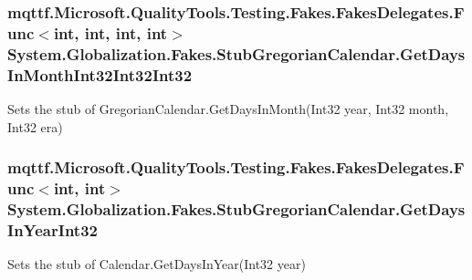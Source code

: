 \hypertarget{class_system_1_1_globalization_1_1_fakes_1_1_stub_gregorian_calendar_a970efcc1ed7aea103c4cc8fd1636b0a9}{
\subsubsection[{Get\-Days\-In\-Month\-Int32\-Int32\-Int32}]{\setlength{\rightskip}{0pt plus 5cm}mqttf.\-Microsoft.\-Quality\-Tools.\-Testing.\-Fakes.\-Fakes\-Delegates.\-Func$<$int, int, int, int$>$ System.\-Globalization.\-Fakes.\-Stub\-Gregorian\-Calendar.\-Get\-Days\-In\-Month\-Int32\-Int32\-Int32}}\label{class_system_1_1_globalization_1_1_fakes_1_1_stub_gregorian_calendar_a970efcc1ed7aea103c4cc8fd1636b0a9}


Sets the stub of Gregorian\-Calendar.\-Get\-Days\-In\-Month(\-Int32 year, Int32 month, Int32 era)

\hypertarget{class_system_1_1_globalization_1_1_fakes_1_1_stub_gregorian_calendar_a13e0a6c756144daecad794eef48fa86d}{
\subsubsection[{Get\-Days\-In\-Year\-Int32}]{\setlength{\rightskip}{0pt plus 5cm}mqttf.\-Microsoft.\-Quality\-Tools.\-Testing.\-Fakes.\-Fakes\-Delegates.\-Func$<$int, int$>$ System.\-Globalization.\-Fakes.\-Stub\-Gregorian\-Calendar.\-Get\-Days\-In\-Year\-Int32}}\label{class_system_1_1_globalization_1_1_fakes_1_1_stub_gregorian_calendar_a13e0a6c756144daecad794eef48fa86d}


Sets the stub of Calendar.\-Get\-Days\-In\-Year(\-Int32 year)

